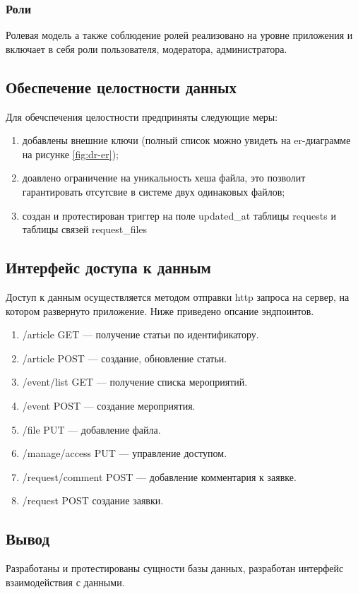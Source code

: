 \subsubsection{Роли}

Ролевая модель а также соблюдение ролей реализовано на уровне приложения и включает в себя
роли пользователя, модератора, администратора.

\subsection{Обеспечение целостности данных}

Для обечспечения целостности предприняты следующие меры:
\begin{enumerate}
	\item добавлены внешние ключи (полный список можно увидеть на er-диаграмме на рисунке \ref{fig:dr-er});
	\item доавлено ограничение на уникальность хеша файла, это позволит гарантировать отсутсвие в системе двух одинаковых файлов;
	\item создан и протестирован триггер на поле updated{\_}at таблицы requests и таблицы связей request{\_}files
\end{enumerate}


\subsection{Интерфейс доступа к данным}

Доступ к данным осуществляется методом отправки http запроса на сервер, на котором развернуто приложение. Ниже приведено опсание эндпоинтов.

\begin{enumerate}
	\item /article GET --- получение статьи по идентификатору.
	\item /article POST --- создание, обновление статьи.
	\item /event/list GET --- получение списка мероприятий.
	\item /event POST --- создание мероприятия.
	\item /file PUT --- добавление файла.
	\item /manage/access PUT --- управление доступом.
	\item /request/comment POST --- добавление комментария к заявке.
	\item /request POST создание заявки.
\end{enumerate}

\subsection{Вывод}

Разработаны и протестированы сущности базы данных, разработан интерфейс взаимодействия с данными.

\pagebreak